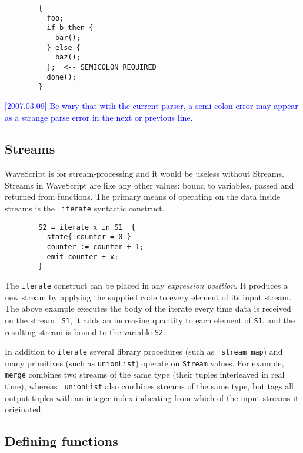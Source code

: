 \documentclass[twocolumn]{report}
\newcommand{\rednote}[1]{{\textcolor{blue}{#1}}}
\begin{document}
\begin{verbatim}
        {
          foo;
          if b then {
            bar();
          } else {
            baz();
          };  <-- SEMICOLON REQUIRED
          done();
        }
\end{verbatim}

\rednote{[2007.03.09] Be wary that with the current parser, a
  semi-colon error may appear as a strange parse error in the next
  or previous line.}


\subsection{Streams}

WaveScript is for stream-processing and it would be useless without
Streams.  
Streams in WaveScript are like any other values: bound to variables,
passed and returned from functions.
The primary means of operating on the data inside streams is the {\tt
  iterate} syntactic construct.

\begin{verbatim}
        S2 = iterate x in S1  {
          state{ counter = 0 }
          counter := counter + 1;
          emit counter + x;
        }
\end{verbatim}

The {\tt iterate} construct can be placed in any {\em expression
position}.  It produces a new stream by applying the supplied code to
every element of its input stream.  The above example executes the
body of the iterate every time data is received on the stream {\tt
  S1}, it adds an increasing quantity to each element of {\tt S1}, and the
resulting stream is bound to the variable {\tt S2}.

In addition to {\tt iterate} several library procedures (such as {\tt
stream\_map}) and many primitives (such as {\tt unionList}) operate on
{\tt Stream} values.  For example, {\tt merge} combines two streams of the same
type (their tuples interleaved in real time), whereas {\tt
  unionList} also combines streams of the same type, but tags all
output tuples with an integer index indicating from which of the input
streams it originated.


\subsection{Defining functions}
\label{udfs}
\end{document}
